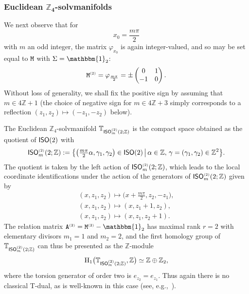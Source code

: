 \documentclass[pdftex]{sigma}
\numberwithin{equation}{section}
\newcommand{\Z}{\zed}
\newcommand{\unit}{\mathbbm{1}} 			%
\newcommand{\rmH}{{\rm H}}
\newcommand{\ISO}{{\sf ISO}}
\newcommand{\zed}{{\mathbb Z}} %
\newcommand{\torus}{{\mathbb T}} %
\begin{document}
\subsubsection*{Euclidean $\boldsymbol{\Z_4}$-solvmanifolds}

We next observe that for
\[
x_0 = \frac{m \pi}2
\]
with $m$ an odd integer, the matrix $\varphi_{x_0}$ is again integer-valued, and so
may be set equal to $\tt M$ with $\Sigma=\unit_2$:
\begin{gather}\label{eq:mon2}
{\tt M}^{\text{\tiny(2)}} = \varphi^{\phantom{\dag}}_{\frac{m \pi}2} = \pm\left( \begin{matrix}
0 & 1 \\ -1 & 0
\end{matrix} \right)  .
\end{gather}
Without loss of generality, we shall fix the positive sign by assuming that $m\in
4 \mathbb{Z}+1$ (the choice of negative sign for $m\in4 \Z+3$ simply
corresponds to a reflection $(z_1,z_2)\mapsto(-z_1,-z_2)$ below).

The Euclidean
$\Z_4$-solvmanifold $\torus_{\ISO ^{\text{\tiny(2)}}_m(2;\Z)}$ is the compact
space obtained as the quotient of $\ISO(2)$ with
\[
\ISO ^{\text{\tiny(2)}}_m(2;\Z) := \big\{ \big(\tfrac{m \pi}2 \alpha,\gamma_1,\gamma_2\big)\in\ISO(2) \,
\big| \, \alpha\in\Z , \, \gamma=(\gamma_1,\gamma_2)\in\Z^2 \big\} .
\]
The quotient is taken by the left action of
$\ISO ^{\text{\tiny(2)}}_m(2;\Z)$, which leads
to the local coordinate identifications under the action of the
generators of $\ISO ^{\text{\tiny(2)}}_m(2;\Z)$ given by
\begin{gather*}
(x,z_1,z_2)\longmapsto \big(x+\tfrac{m \pi}2,z_2,-z_1\big) , \nonumber \\
(x,z_1,z_2)\longmapsto (x,z_1+1,z_2) , \nonumber \\
(x,z_1,z_2)\longmapsto (x,z_1,z_2+1) .%
\end{gather*}
The relation matrix $
{\tt A}^{\text{\tiny(2)}} = {\tt M}^{\text{\tiny(2)}}-\unit_2 $ has maximal rank $r=2$ with elementary divisors $m_1=1$ and
$m_2=2$, and the first homology group of
$\torus_{\ISO ^{\text{\tiny(2)}}_m(2;\Z)}$ can thus be presented as the $\Z$-module
\[
\rmH_1\big(\torus_{\ISO ^{\text{\tiny(2)}}_m(2;\Z)},\Z\big) \simeq \Z\oplus\Z_2 ,
\]
where the torsion
generator of order two is $e_{z_2}=e_{z_1}$. Thus again there is no
classical T-dual, as is well-known in
this case (see, e.g.,~\cite{Hull2019}).
\end{document}
